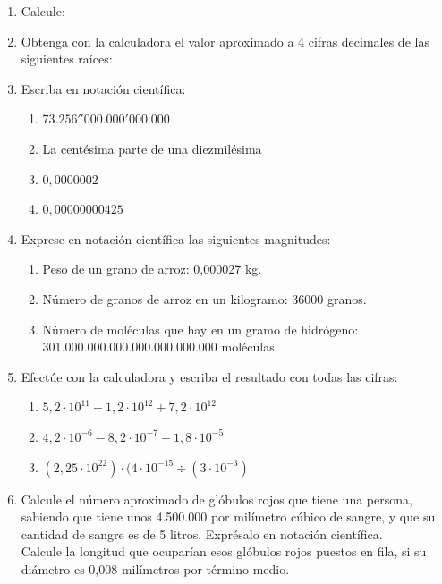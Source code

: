 \documentclass[twoside]{article}
\begin{document}
\begin{enumerate}
\begin{enumerate}
\end{enumerate}
\item Calcule:
\begin{enumerate}
\end{enumerate}
\item Obtenga con la calculadora el valor aproximado a 4 cifras decimales de las siguientes raíces:
\begin{enumerate}
\end{enumerate}
\item Escriba en notación científica:
\begin{enumerate}
\item $73.256''000.000'000.000$
\item La centésima parte de una diezmilésima
\item $0,0000002$
\item $0,00000000425$
\end{enumerate}
\item Exprese en notación científica las siguientes magnitudes:
\begin{enumerate}
\item Peso de un grano de arroz: 0,000027 kg.
\item Número de granos de arroz en un kilogramo: 36000 granos.
\item Número de moléculas que hay en un gramo de hidrógeno:\\ 301.000.000.000.000.000.000.000 moléculas.
\end{enumerate}
\item Efectúe con la calculadora y escriba el resultado con todas las cifras:
\begin{enumerate}
\item $5,2\cdot 10^{11}-1,2\cdot 10^{12}+7,2 \cdot 10^{12}$
\item $4,2\cdot 10^{-6}-8,2\cdot 10^{-7}+1,8\cdot 10^{-5}$
\item $(2,25\cdot 10^{22})\cdot (4\cdot 10^{-15}\div (3\cdot 10^{-3})$
\end{enumerate}
\item Calcule el número aproximado de glóbulos rojos que tiene una persona, sabiendo que tiene unos 4.500.000 por milímetro cúbico de sangre, y que su cantidad de sangre es de 5 litros. Exprésalo en notación científica.\\Calcule la longitud que ocuparían esos glóbulos rojos puestos en fila, si su diámetro es 0,008 milímetros por término medio.
\end{enumerate}
\end{document}
